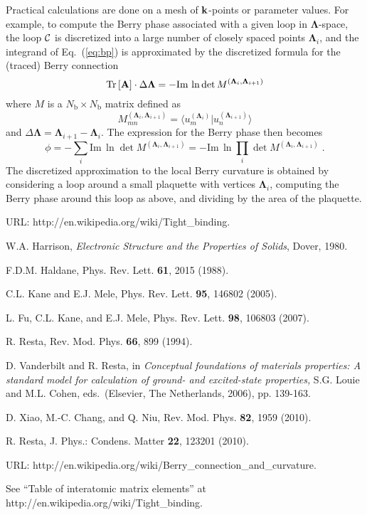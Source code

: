 \documentclass[11pt]{article}
\numberwithin{equation}{section} %
\def\beq{\begin{equation}}
\def\eeq{\end{equation}}
\newcommand{\equ}[1]{Eq.~(\ref{eq:#1})}
\renewcommand{\Im}{\textrm{Im}}
\def\ip#1#2{\langle #1 \vert #2 \rangle}
\def\A{{\bf A}}
\def\k{{\bf k}}
\def\bL{\mathbf{\Lambda}}
\def\Im{\textrm{Im}\,}
\def\Tr{\textrm{Tr}\,}
\def\cC{{\cal C}}
\def\Nb{N_\textrm{b}}
\begin{document}
Practical calculations are done on a mesh of $\k$-points or
parameter values.  For example, to compute the Berry phase
associated with a given loop in $\bL$-space, the loop $\cC$ is
discretized into a large number of closely spaced points
$\bL_i$, and the integrand of \equ{bp} is approximated
by the discretized formula for the (traced) Berry connection
%
\beq
\Tr[\A]\cdot\Delta\bL = -\Im\ln\det M^{(\bL_i,\bL_{i+1})}
\eeq
%
where $M$ is a $\Nb\times\Nb$ matrix defined as
%
\beq
M_{mn}^{(\bL_i,\bL_{i+1})} = \ip{u_m^{(\bL_i)}}{u_n^{(\bL_{i+1})}}
\eeq
%
and $\Delta\bL=\bL_{i+1}-\bL_i$.
The expression for the Berry phase then becomes
%
\beq
\phi=-\sum_i \Im\ln\det M^{(\bL_i,\bL_{i+1})}
    =-\Im\ln\prod_i\det M^{(\bL_i,\bL_{i+1})} \;.
\eeq
%
The discretized approximation to the local Berry curvature is
obtained by considering a loop around a small plaquette with
vertices $\bL_i$, computing the Berry phase around this loop as
above, and dividing by the area of the plaquette.

\begin{thebibliography}{0}

 URL:
http://en.wikipedia.org/wiki/Tight\_binding.

 W.A. Harrison, \textit{Electronic Structure and
the Properties of Solids}, Dover, 1980.

 F.D.M. Haldane, Phys. Rev. Lett. {\bf 61}, 2015 (1988).

 C.L. Kane and E.J. Mele, Phys. Rev. Lett. {\bf 95}, 146802 (2005).

 L. Fu, C.L. Kane, and E.J. Mele, Phys. Rev. Lett. {\bf 98},
106803 (2007).

R. Resta, Rev. Mod. Phys. {\bf 66}, 899 (1994).

 D. Vanderbilt and R. Resta, 
in \textit{Conceptual foundations of materials
properties: A standard model for calculation of ground-
and excited-state properties,} S.G. Louie and M.L. Cohen,
eds.\ (Elsevier, The Netherlands, 2006), pp. 139-163.

 D. Xiao, M.-C. Chang, and Q. Niu, Rev. Mod. Phys.
{\bf 82}, 1959 (2010).

R. Resta, J. Phys.: Condens. Matter {\bf 22}, 123201 (2010).

 URL:
http://en.wikipedia.org/wiki/Berry\_connection\_and\_curvature.

 See ``Table of interatomic matrix elements''
at http://en.wikipedia.org/wiki/Tight\_binding.

\end{thebibliography}
\end{document}
